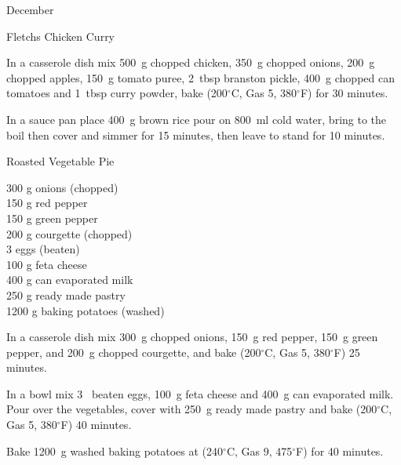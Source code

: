 \begin{menu}{December}
\begin{recipe}{2}{Fletchs Chicken Curry}
\begin{ingredients}
		\end{ingredients}
	
	
	
    \begin{instructions}
    \item 
        In a casserole dish mix
        500~g chopped chicken,
        350~g chopped onions,
        200~g chopped apples,
        150~g  tomato puree,
        2~tbsp  branston pickle,
        400~g chopped can tomatoes
        and
        1~tbsp  curry powder,
        bake (200$^{\circ}$C, Gas 5, 380$^{\circ}$F) for 30 minutes.
      \item 
    In a
    sauce pan
    place
    400~g  brown rice
    pour on
    800~ml  cold water,
    bring to the boil then cover and simmer for 15 minutes,
    then leave to stand for 10 minutes.
  
    \end{instructions}
    \end{recipe}%
  
    \begin{recipe}{2}{Roasted Vegetable Pie}%
		\begin{ingredients}
		300 g onions (chopped) \\
	150 g red pepper  \\
	150 g green pepper  \\
	200 g courgette (chopped) \\
	3  eggs (beaten) \\
	100 g feta cheese  \\
	400 g can evaporated milk  \\
	250 g ready made pastry  \\
	1200 g baking potatoes (washed) \\
	
		\end{ingredients}
	
	
    \begin{instructions}
    \item 
        In a casserole dish mix
        300~g chopped onions,
        150~g  red pepper,
        150~g  green pepper,
        and
        200~g chopped courgette,
        and bake (200$^{\circ}$C, Gas 5, 380$^{\circ}$F) 25 minutes.
      \item 
        In a bowl mix
        3~ beaten eggs,
        100~g  feta cheese
        and
        400~g  can evaporated milk.
        Pour over the vegetables,
        cover with
        250~g  ready made pastry
        and bake (200$^{\circ}$C, Gas 5, 380$^{\circ}$F) 40 minutes.
      \item 
    Bake
    1200~g washed baking potatoes
    at
    (240$^{\circ}$C, Gas 9, 475$^{\circ}$F) for 40 minutes.
  

\end{instructions}
\end{recipe}
\end{menu}
